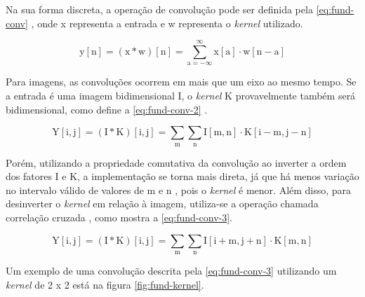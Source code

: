 Na sua forma discreta, a operação de convolução pode ser definida pela \autoref{eq:fund-conv} \cite{ref:Goodfellow-Bengio-Courville}, onde x representa a entrada e w representa o \textit{kernel} utilizado.

\begin{equation} \label{eq:fund-conv}
\mathrm{
  y[n] = (x \ast w)[n] = \sum_{a = -\infty}^{\infty} x[a] \cdot w [n - a]
}
\end{equation}

Para imagens, as convoluções ocorrem em mais que um eixo ao mesmo tempo. Se a entrada é uma imagem bidimensional I, o \textit{kernel} K provavelmente também será bidimensional, como define a \autoref{eq:fund-conv-2} \cite{ref:Goodfellow-Bengio-Courville}.

\begin{equation} \label{eq:fund-conv-2}
\mathrm{
  Y[i, j] = (I \ast K)[i, j] = \sum_{m} \sum_{n} I[m,n] \cdot K [i-m, j-n]
}
\end{equation}

Porém, utilizando a propriedade comutativa da convolução ao inverter a ordem dos fatores I e K, a implementação se torna mais direta, já que há menos variação no intervalo válido de valores de m e n \cite{ref:Goodfellow-Bengio-Courville}, pois o \textit{kernel} é menor. Além disso, para desinverter o \textit{kernel} em relação à imagem, utiliza-se a operação chamada correlação cruzada \cite{ref:Goodfellow-Bengio-Courville}, como mostra a \autoref{eq:fund-conv-3}.

\begin{equation} \label{eq:fund-conv-3}
\mathrm{
 Y[i, j] = (I \ast K)[i, j] = \sum_{m} \sum_{n} I[i + m,j + n] \cdot K [m,n]
}
\end{equation}

Um exemplo de uma convolução descrita pela \autoref{eq:fund-conv-3} utilizando um \textit{kernel} de 2 x 2 está na figura \autoref{fig:fund-kernel}.

